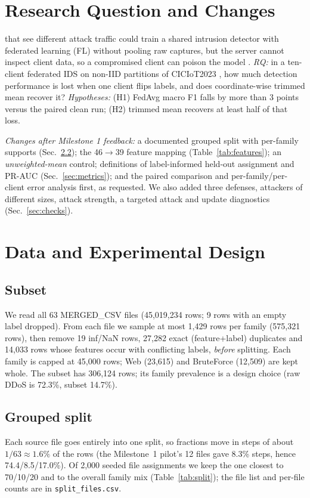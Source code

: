 \documentclass[journal]{IEEEtran}
\begin{document}
\section{Research Question and Changes}
 that see different attack traffic could train a shared intrusion detector with federated learning (FL) \cite{mcmahan2017} without pooling raw captures, but the server cannot inspect client data, so a compromised client can poison the model \cite{tolpegin2020}.
\emph{RQ:} in a ten-client federated IDS on non-IID partitions of CICIoT2023 \cite{neto2023}, how much detection performance is lost when one client flips labels, and does coordinate-wise trimmed mean \cite{yin2018} recover it?
\emph{Hypotheses:} (H1) FedAvg macro F1 falls by more than 3 points versus the paired clean run; (H2) trimmed mean recovers at least half of that loss.

\emph{Changes after Milestone 1 feedback:} a documented grouped split with per-family supports (Sec.~\ref{sec:split}); the 46$\rightarrow$39 feature mapping (Table~\ref{tab:features}); an \emph{unweighted-mean} control; definitions of label-informed held-out assignment and PR-AUC (Sec.~\ref{sec:metrics}); and the paired comparison and per-family/per-client error analysis first, as requested. We also added three defenses, attackers of different sizes, attack strength, a targeted attack and update diagnostics (Sec.~\ref{sec:checks}).

\section{Data and Experimental Design}

\subsection{Subset}
We read all 63 MERGED\_CSV files (45,019,234 rows; 9 rows with an empty label dropped). From each file we sample at most 1,429 rows per family (575,321 rows), then remove 19 inf/NaN rows, 27,282 exact (feature+label) duplicates and 14,033 rows whose features occur with conflicting labels, \emph{before} splitting. Each family is capped at 45,000 rows; Web (23,615) and BruteForce (12,509) are kept whole. The subset has 306,124 rows; its family prevalence is a design choice (raw DDoS is 72.3\%, subset 14.7\%).

\subsection{Grouped split}\label{sec:split}
Each source file goes entirely into one split, so fractions move in steps of about $1/63 \approx 1.6\%$ of the rows (the Milestone~1 pilot's 12 files gave 8.3\% steps, hence 74.4/8.5/17.0\%). Of 2,000 seeded file assignments we keep the one closest to 70/10/20 and to the overall family mix (Table~\ref{tab:split}); the file list and per-file counts are in \texttt{split\_files.csv}.
\end{document}
